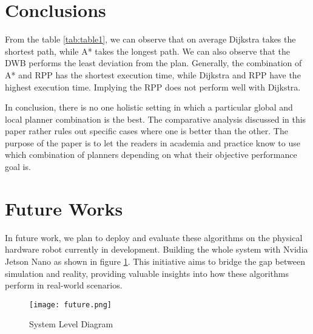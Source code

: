 \documentclass[sigconf]{acmart}
\begin{document}
\section{Conclusions}
From the table \ref{tab:table1}, we can observe that on average Dijkstra takes the shortest path, while A* takes the longest path. We can also observe that the DWB performs the least deviation from the plan. Generally, the combination of A* and RPP has the shortest execution time, while Dijkstra and RPP have the highest execution time. Implying the RPP does not perform well with Dijkstra.

In conclusion, there is no one holistic setting in which a particular global and local planner combination is the best. The comparative analysis discussed in this paper rather rules out specific cases where one is better than the other. The purpose of the paper is to let the readers in academia and practice know to use which combination of planners depending on what their objective performance goal is.


\section{Future Works}
In future work, we plan to deploy and evaluate these algorithms on the physical hardware robot currently in development. Building the whole system with Nvidia Jetson Nano as shown in figure \ref{fig:sds}. This initiative aims to bridge the gap between simulation and reality, providing valuable insights into how these algorithms perform in real-world scenarios.
\begin{figure}[H]
  \centering
  \texttt{[image: future.png]} %
  \caption{System Level Diagram}
  \label{fig:sds}
\end{figure}
\end{document}
